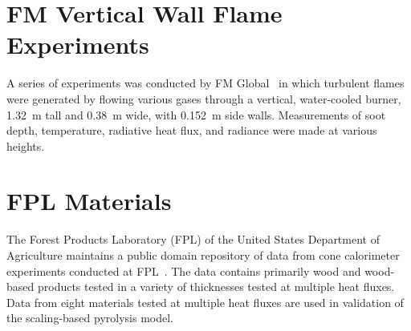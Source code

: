 %
%
%

\section{FM Vertical Wall Flame Experiments}
\label{FM_Vertical_Wall_Flame_Description}

A series of experiments was conducted by FM Global~\cite{deRis:IAFSS} in which turbulent flames were generated by flowing various gases through a vertical, water-cooled burner, 1.32~m tall and 0.38~m wide, with 0.152~m side walls. Measurements of soot depth, temperature, radiative heat flux, and radiance were made at various heights.

\section{FPL Materials}
\label{FPL_Description}

The Forest Products Laboratory (FPL) of the United States Department of Agriculture maintains a public domain repository of data from cone calorimeter experiments conducted at FPL~\cite{FPL:Fire_Database}.
The data contains primarily wood and wood-based products tested in a variety of thicknesses tested at multiple heat fluxes.
Data from eight materials tested at multiple heat fluxes are used in validation of the scaling-based pyrolysis model.

